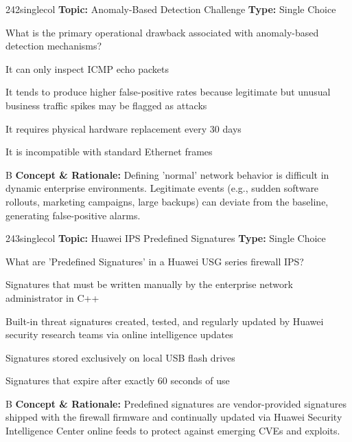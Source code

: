 \begin{qcard}{242}{singlecol}
\textcolor{darkslate!75}{\small\textbf{Topic:} Anomaly-Based Detection Challenge \hfill \textbf{Type:} Single Choice}\vspace{0.4em}\par
What is the primary operational drawback associated with anomaly-based detection mechanisms?
\begin{qoptions}
\item It can only inspect ICMP echo packets
\item It tends to produce higher false-positive rates because legitimate but unusual business traffic spikes may be flagged as attacks
\item It requires physical hardware replacement every 30 days
\item It is incompatible with standard Ethernet frames
\end{qoptions}
\end{qcard}
\nopagebreak
\begin{explainbox}{B}
\textbf{Concept \& Rationale:} Defining 'normal' network behavior is difficult in dynamic enterprise environments. Legitimate events (e.g., sudden software rollouts, marketing campaigns, large backups) can deviate from the baseline, generating false-positive alarms.
\end{explainbox}

\begin{qcard}{243}{singlecol}
\textcolor{darkslate!75}{\small\textbf{Topic:} Huawei IPS Predefined Signatures \hfill \textbf{Type:} Single Choice}\vspace{0.4em}\par
What are 'Predefined Signatures' in a Huawei USG series firewall IPS?
\begin{qoptions}
\item Signatures that must be written manually by the enterprise network administrator in C++
\item Built-in threat signatures created, tested, and regularly updated by Huawei security research teams via online intelligence updates
\item Signatures stored exclusively on local USB flash drives
\item Signatures that expire after exactly 60 seconds of use
\end{qoptions}
\end{qcard}
\nopagebreak
\begin{explainbox}{B}
\textbf{Concept \& Rationale:} Predefined signatures are vendor-provided signatures shipped with the firewall firmware and continually updated via Huawei Security Intelligence Center online feeds to protect against emerging CVEs and exploits.
\end{explainbox}

